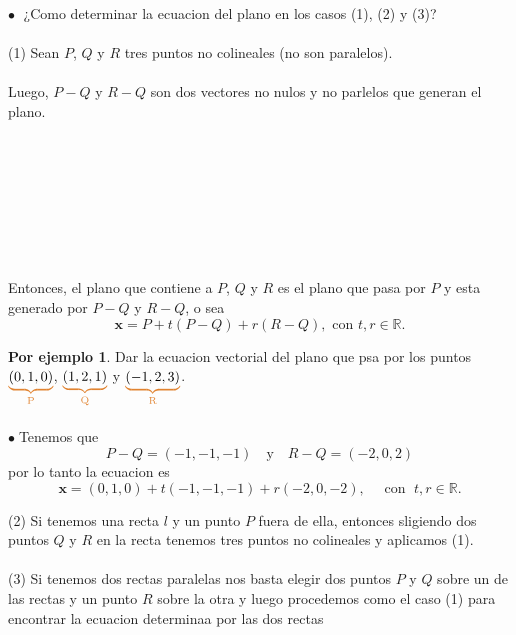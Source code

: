 \documentclass{article}
\theoremstyle{definition}
\newtheorem*{ej}{Por ejemplo}
\theoremstyle{remark}
\newcommand\bl{$\bullet\;$}
\begin{document}
\textcolor{rojop2}{\bl} ¿Como determinar la ecuacion del plano en los casos \textcolor{rojop2}{(1)}, \textcolor{rojop2}{(2)} y \textcolor{rojop2}{(3)}? 
\\\\
\textcolor{rojop2}{(1)} Sean $P$, $Q$ y $R$ tres puntos no colineales \big(no son paralelos\big).\\ 
\\ Luego, $P-Q$ y $R-Q$ son dos vectores no nulos y no parlelos que generan el plano.\\\\\\\\\\\\\\\; \\\\
Entonces, el plano que contiene a $P$, $Q$ y $R$  es el plano que pasa por $P$ y esta generado por $P-Q$ y $R-Q$, o sea \[
  \mathbf{x}=P+t(P-Q)+r(R-Q), \text{ con } t, r \in \mathbb{R}.
\] \;
\begin{figure}[h]
\centering
\def\svgwidth{1\textwidth}

\end{figure}

\begin{ej}
  Dar la ecuacion vectorial del plano que psa por los puntos $\textcolor{rojop2}{\underbrace{\textcolor{black}{(0,1,0)}}_{\text{P}}}$, $\textcolor{rojop2}{\underbrace{\textcolor{black}{(1,2,1)}}_{\text{Q}}}$ y $\textcolor{rojop2}{\underbrace{\textcolor{black}{(-1,2,3)}}_{\text{R}}}$. \\\\ 
  \bl Tenemos que \[ 
    P-Q = (-1,-1,-1) \quad \text{y} \quad R-Q=(-2,0,2)
  \] por lo tanto la ecuacion es $$\mathbf{x}=(0,1,0)+t(-1,-1,-1)+r(-2,0,-2), \quad \text{ con } \; t, r \in \mathbb{R}.$$
\end{ej}
\pagebreak
\textcolor{rojop2}{(2)} Si tenemos una recta $l$ y un punto $P$ fuera de ella, entonces sligiendo dos puntos $Q$ y $R$ en la recta tenemos tres puntos no colineales y aplicamos \textcolor{rojop2}{(1)}. \\\\
\textcolor{rojop2}{(3)} Si tenemos dos rectas paralelas nos basta elegir dos puntos $P$ y $Q$ sobre un de las rectas y un punto $R$ sobre la otra y luego procedemos como el caso \textcolor{rojop2}{(1)} para encontrar la ecuacion determinaa por las dos rectas
\end{document}

